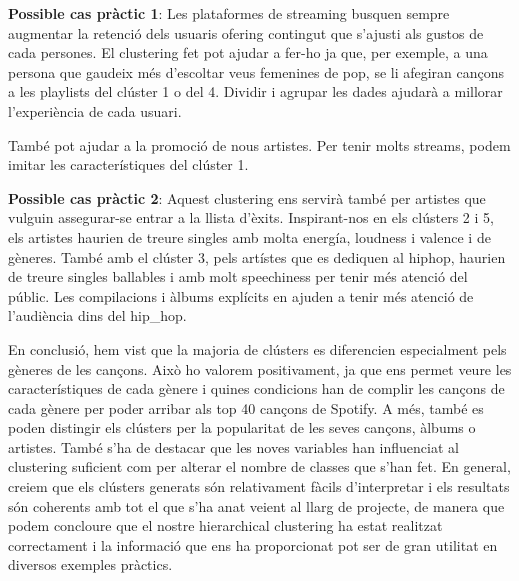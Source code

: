 \textbf{Possible cas pràctic 1}: Les plataformes de streaming busquen sempre augmentar la retenció dels usuaris ofering contingut que s'ajusti als gustos de cada persones. El clustering fet pot ajudar a fer-ho ja que, per exemple, a una persona que gaudeix més d'escoltar veus femenines de pop, se li afegiran cançons a les playlists del clúster 1 o del 4. Dividir i agrupar les dades ajudarà a millorar l'experiència de cada usuari. 

També pot ajudar a la promoció de nous artistes. Per tenir molts streams, podem imitar les característiques del clúster 1.

\textbf{Possible cas pràctic 2}: Aquest clustering ens servirà també per artistes que vulguin assegurar-se entrar a la llista d'èxits. Inspirant-nos en els clústers 2 i 5, els artistes haurien de treure singles amb molta energía, loudness i valence i de gèneres. També amb el clúster 3, pels artístes que es dediquen al hiphop, haurien de treure singles ballables i amb molt speechiness per tenir més atenció del públic. Les compilacions i àlbums explícits en ajuden a tenir més atenció de l'audiència dins del hip\_hop. 

En conclusió, hem vist que la majoria de clústers es diferencien especialment pels gèneres de les cançons. Això ho valorem positivament, ja que ens permet veure les característiques de cada gènere i quines condicions han de complir les cançons de cada gènere per poder arribar als top 40 cançons de Spotify. A més, també es poden distingir els clústers per la popularitat de les seves cançons, àlbums o artistes. També s'ha de destacar que les noves variables han influenciat al clustering suficient com per alterar el nombre de classes que s'han fet. En general, creiem que els clústers generats són relativament fàcils d'interpretar i els resultats són coherents amb tot el que s'ha anat veient al llarg de projecte, de manera que podem concloure que el nostre hierarchical clustering ha estat realitzat correctament i la informació que ens ha proporcionat pot ser de gran utilitat en diversos exemples pràctics.





